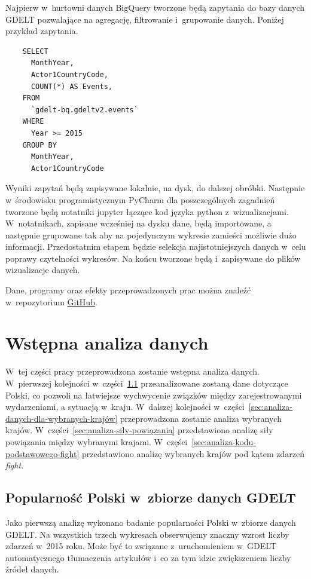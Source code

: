 \documentclass[11pt]{report}
\begin{document}
    Najpierw w~hurtowni danych BigQuery tworzone będą zapytania do bazy danych GDELT pozwalające na agregację, filtrowanie i~grupowanie danych.
    Poniżej przykład zapytania.

    \begin{verbatim}
    SELECT
      MonthYear,
      Actor1CountryCode,
      COUNT(*) AS Events,
    FROM
      `gdelt-bq.gdeltv2.events`
    WHERE
      Year >= 2015
    GROUP BY
      MonthYear,
      Actor1CountryCode
    \end{verbatim}

    Wyniki zapytań będą zapisywane lokalnie, na dysk, do dalszej obróbki.
    Następnie w~środowisku programistycznym PyCharm dla poszczególnych zagadnień tworzone będą notatniki jupyter łączące kod języka python z~wizualizacjami.
    W~notatnikach, zapisane wcześniej na dysku dane, będą importowane, a następnie grupowane tak aby na pojedynczym wykresie zamieści możliwie dużo informacji.
    Przedostatnim etapem będzie selekcja najistotniejszych danych w~celu poprawy czytelności wykresów.
    Na końcu tworzone będą i~zapisywane do plików wizualizacje danych.

    Dane, programy oraz efekty przeprowadzonych prac można znaleźć w~repozytorium \href{https://github.com/mijapa/GDELT}{GitHub}.


    \chapter{Wstępna analiza danych}\label{ch:wstępna-analiza-danych}
    W~tej części pracy przeprowadzona zostanie wstępna analiza danych.
    W~pierwszej kolejności w~części~\ref{sec:popularność-polski-w-zbiorze-danych-gdelt} przeanalizowane zostaną dane dotyczące Polski, co pozwoli na łatwiejsze wychwycenie związków między zarejestrowanymi wydarzeniami, a sytuacją w~kraju.
    W~dalszej kolejności w~części~\ref{sec:analiza-danych-dla-wybranych-krajów} przeprowadzona zostanie analiza wybranych krajów.
    W~części~\ref{sec:analiza-siły-powiązania} przedstawiono analizę siły powiązania między wybranymi krajami.
    W~części~\ref{sec:analiza-kodu-podstawowego-fight} przedstawiono analizę wybranych krajów pod kątem zdarzeń \textit{fight}.


    \section{Popularność Polski w~zbiorze danych GDELT}\label{sec:popularność-polski-w-zbiorze-danych-gdelt}
    Jako pierwszą analizę wykonano badanie popularności Polski w~zbiorze danych GDELT. Na wszystkich trzech wykresach obserwujemy znaczny wzrost liczby zdarzeń w~2015 roku. Może być to związane z~uruchomieniem w~GDELT automatycznego tłumaczenia artykułów i~co za tym idzie zwiększeniem liczby źródeł danych.
\end{document}
